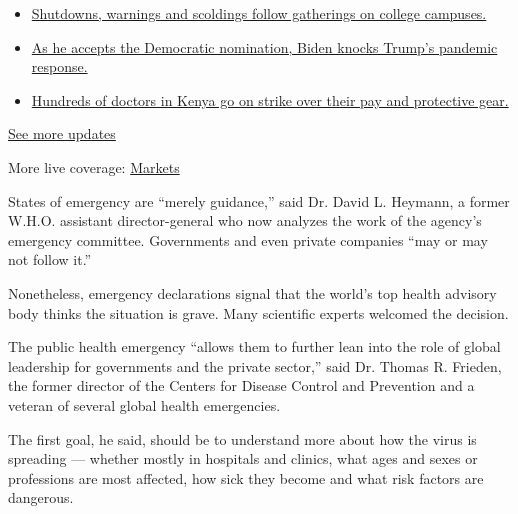 \begin{itemize}
\tightlist
\item
  \href{https://www.nytimes3xbfgragh.onion/2020/08/21/world/covid-19-coronavirus.html?action=click\&pgtype=Article\&state=default\&region=MAIN_CONTENT_1\&context=storylines_live_updates\#link-4690b6aa}{Shutdowns,
  warnings and scoldings follow gatherings on college campuses.}
\item
  \href{https://www.nytimes3xbfgragh.onion/2020/08/21/world/covid-19-coronavirus.html?action=click\&pgtype=Article\&state=default\&region=MAIN_CONTENT_1\&context=storylines_live_updates\#link-324af071}{As
  he accepts the Democratic nomination, Biden knocks Trump's pandemic
  response.}
\item
  \href{https://www.nytimes3xbfgragh.onion/2020/08/21/world/covid-19-coronavirus.html?action=click\&pgtype=Article\&state=default\&region=MAIN_CONTENT_1\&context=storylines_live_updates\#link-35890b73}{Hundreds
  of doctors in Kenya go on strike over their pay and protective gear.}
\end{itemize}

\href{https://www.nytimes3xbfgragh.onion/2020/08/21/world/covid-19-coronavirus.html?action=click\&pgtype=Article\&state=default\&region=MAIN_CONTENT_1\&context=storylines_live_updates}{See
more updates}

More live coverage:
\href{https://www.nytimes3xbfgragh.onion/live/2020/08/20/business/stock-market-today-coronavirus?action=click\&pgtype=Article\&state=default\&region=MAIN_CONTENT_1\&context=storylines_live_updates}{Markets}

States of emergency are ``merely guidance,'' said Dr. David L. Heymann,
a former W.H.O. assistant director-general who now analyzes the work of
the agency's emergency committee. Governments and even private companies
``may or may not follow it.''

Nonetheless, emergency declarations signal that the world's top health
advisory body thinks the situation is grave. Many scientific experts
welcomed the decision.

The public health emergency ``allows them to further lean into the role
of global leadership for governments and the private sector,'' said Dr.
Thomas R. Frieden, the former director of the Centers for Disease
Control and Prevention and a veteran of several global health
emergencies.

The first goal, he said, should be to understand more about how the
virus is spreading --- whether mostly in hospitals and clinics, what
ages and sexes or professions are most affected, how sick they become
and what risk factors are dangerous.

